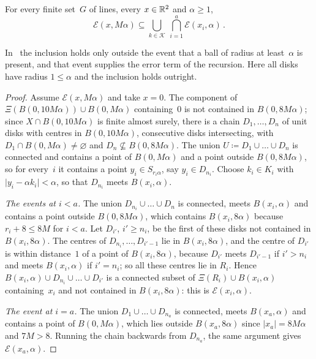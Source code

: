 \documentclass[11pt,letterpaper]{article}
\renewcommand{\cE}{\mathcal E}
\begin{document}
\begin{lemma}
\label{lem:inclusion}
For every finite set~$G$ of lines, every $x\in\mathbb R^2$ and $\alpha\ge1$,
\begin{equation}
\label{eq:inclusion}
  \cE(x,M\alpha)\subseteq\bigcup_{k\in\mathcal K}\ \bigcap_{i=1}^{a}\cE(x_i,\alpha)\,.
\end{equation}
\end{lemma}

In~\cite{Gou08} the inclusion holds only outside the event that a ball of radius at least~$\alpha$ is present, and that event supplies the error term of the recursion. Here all disks have radius $1\le\alpha$ and the inclusion holds outright.

\begin{proof}
Assume $\cE(x,M\alpha)$ and take $x=0$. The component of $\Xi(B(0,10M\alpha))\cup B(0,M\alpha)$ containing~$0$ is not contained in $B(0,8M\alpha)$; since $X\cap B(0,10M\alpha)$ is finite almost surely, there is a chain $D_1,\dots,D_n$ of unit disks with centres in $B(0,10M\alpha)$, consecutive disks intersecting, with $D_1\cap B(0,M\alpha)\neq\varnothing$ and $D_n\not\subseteq B(0,8M\alpha)$. The union $U\coloneqq D_1\cup\dots\cup D_n$ is connected and contains a point of $B(0,M\alpha)$ and a point outside $B(0,8M\alpha)$, so for every~$i$ it contains a point $y_i\in S_{r_i\alpha}$, say $y_i\in D_{n_i}$. Choose $k_i\in K_i$ with $\lvert y_i-\alpha k_i\rvert<\alpha$, so that $D_{n_i}$ meets $B(x_i,\alpha)$.

\emph{The events at $i<a$.} The union $D_{n_i}\cup\dots\cup D_n$ is connected, meets $B(x_i,\alpha)$ and contains a point outside $B(0,8M\alpha)$, which contains $B(x_i,8\alpha)$ because $r_i+8\le8M$ for $i<a$. Let $D_{i'}$, $i'\ge n_i$, be the first of these disks not contained in $B(x_i,8\alpha)$. The centres of $D_{n_i},\dots,D_{i'-1}$ lie in $B(x_i,8\alpha)$, and the centre of $D_{i'}$ is within distance~$1$ of a point of $B(x_i,8\alpha)$, because $D_{i'}$ meets $D_{i'-1}$ if $i'>n_i$ and meets $B(x_i,\alpha)$ if $i'=n_i$; so all these centres lie in $R_i$. Hence $B(x_i,\alpha)\cup D_{n_i}\cup\dots\cup D_{i'}$ is a connected subset of $\Xi(R_i)\cup B(x_i,\alpha)$ containing~$x_i$ and not contained in $B(x_i,8\alpha)$: this is $\cE(x_i,\alpha)$.

\emph{The event at $i=a$.} The union $D_1\cup\dots\cup D_{n_a}$ is connected, meets $B(x_a,\alpha)$ and contains a point of $B(0,M\alpha)$, which lies outside $B(x_a,8\alpha)$ since $\lvert x_a\rvert=8M\alpha$ and $7M>8$. Running the chain backwards from $D_{n_a}$, the same argument gives $\cE(x_a,\alpha)$.
\end{proof}
\end{document}
